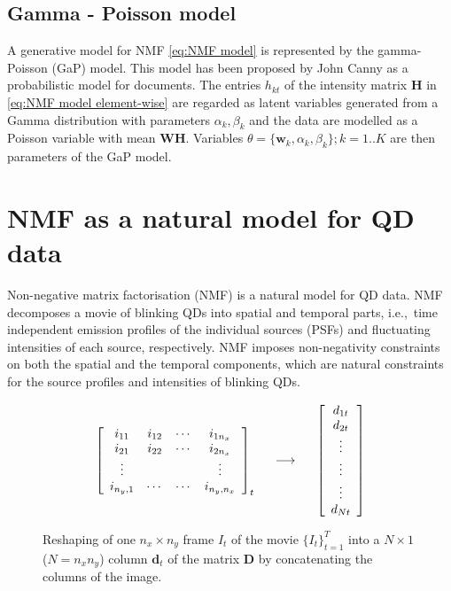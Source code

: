 \subsection{Gamma - Poisson model \label{sub:GaP}}
A generative model for NMF \autoref{eq:NMF model} is represented by the gamma-Poisson (GaP) model. This model has been proposed by John Canny \cite{Canny2004} as a probabilistic model for documents. The entries $h_{kt}$ of the intensity matrix $\bm{H}$ in \autoref{eq:NMF model element-wise} are regarded as latent variables generated from a Gamma distribution with parameters $\alpha_k, \beta_k$ and the data are modelled as a Poisson variable with mean $\bm{WH}$. Variables $\theta = \{\bm{w}_k,\alpha_k, \beta_k\}; k = 1..K$ are then parameters of the GaP model.

\clearpage
\section{NMF as a natural model for QD data\label{sec: NMF QD}}
Non-negative matrix factorisation (NMF) \cite{Lee1999,Lee2001} is a natural model for QD data. NMF decomposes a movie of blinking QDs into spatial and temporal parts, i.e.,\ time independent emission profiles of the individual sources (PSFs) and fluctuating intensities of each source, respectively. NMF imposes non-negativity constraints on both the spatial and the temporal components, which are natural constraints for the source profiles and intensities of blinking QDs.

\begin{figure}[!tb]
	\begin{equation}
		\left[
		\begin{array}{ccccc}
		i_{11} & i_{12}  & \cdots & i_{1n_x}\\
		i_{21} & i_{22}  & \cdots & i_{2n_x}\\
		\vdots & & & \vdots\\
		i_{n_y,1} & \cdots & \cdots & i_{n_y,n_x}
		\end{array}	
		\right]_t
		\hspace{.5cm}
		\longrightarrow
		\hspace{.5cm}
		\left[
		\begin{array}{c}	
		d_{1t}\\	d_{2t}\\	\vdots\\ \vdots\\ \vdots\\ d_{Nt}
		\end{array}
		\right]\nonumber
	\end{equation}
	\caption{Reshaping of one $n_x \times n_y$ frame $I_t$ of the movie $\{I_t\}_{t=1}^T$ into a $N\times 1$ ($N=n_x n_y$) column $\bm{d}_t$ of the matrix $\bm{D}$ by concatenating the columns of the image.}
	\label{fig:reshape image}
\end{figure}


